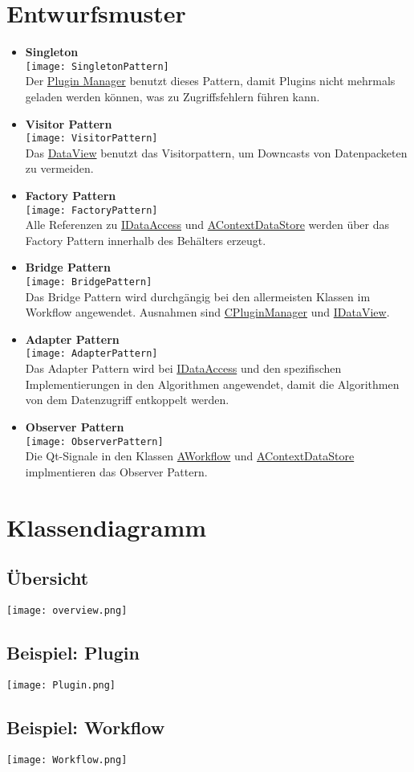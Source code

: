 \section{Entwurfsmuster}
\begin{itemize}
	\item \textbf{Singleton}
	\\\texttt{[image: SingletonPattern]}
	\\ Der \hyperref[Workflow:CPluginManager]{Plugin Manager} benutzt dieses Pattern, damit Plugins nicht mehrmals geladen werden können, was zu Zugriffsfehlern führen kann.
	\item \textbf{Visitor Pattern}
	\\\texttt{[image: VisitorPattern]}
	\\ Das \hyperref[Workflow:IDataView]{DataView} benutzt das Visitorpattern, um Downcasts von Datenpacketen zu vermeiden.
	\item \textbf{Factory Pattern}
	\\\texttt{[image: FactoryPattern]}
	\\ Alle Referenzen zu \hyperref[Workflow:IDataAccess]{IDataAccess} und \hyperref[Workflow:AContextDataStore]{AContextDataStore} werden über das Factory Pattern innerhalb des Behälters erzeugt.
	\item \textbf{Bridge Pattern}
	\\\texttt{[image: BridgePattern]}
	\\ Das Bridge Pattern wird durchgängig bei den allermeisten Klassen im Workflow angewendet. Ausnahmen sind \hyperref[Workflow:CPluginManager]{CPluginManager} und \hyperref[Workflow:IDataView]{IDataView}.
	\item \textbf{Adapter Pattern}
	\\\texttt{[image: AdapterPattern]}
	\\ Das Adapter Pattern wird bei \hyperref[Workflow:IDataAccess]{IDataAccess} und den spezifischen Implementierungen in den Algorithmen angewendet, damit die Algorithmen von dem Datenzugriff entkoppelt werden.
	\item \textbf{Observer Pattern}
	\\\texttt{[image: ObserverPattern]}
	\\ Die Qt-Signale in den Klassen \hyperref[Workflow:AWorkflow]{AWorkflow} und \hyperref[Workflow:AContextDataStore]{AContextDataStore} implmentieren das Observer Pattern.
\end{itemize}
\section{Klassendiagramm}
\subsection{Übersicht}
\texttt{[image: overview.png]}
\subsection{Beispiel: Plugin}
\texttt{[image: Plugin.png]}
\subsection{Beispiel: Workflow}
\texttt{[image: Workflow.png]}